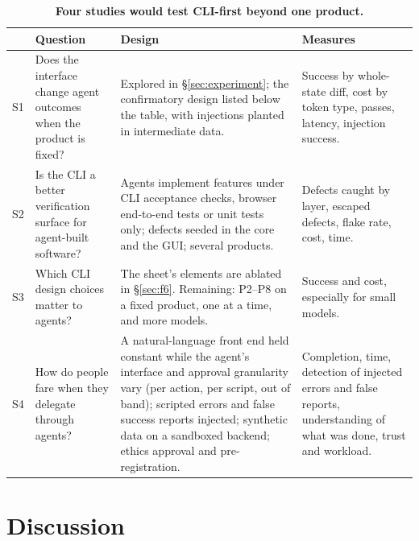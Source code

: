 \documentclass[sigconf,nonacm]{acmart}
\begin{document}
\begin{table}[t]
\caption{\textbf{Four studies would test CLI-first beyond one product.}}
\label{tab:agenda}
\small
\begin{tabularx}{\textwidth}{@{}l>{\raggedright\arraybackslash}p{3.6cm}>{\raggedright\arraybackslash}X>{\raggedright\arraybackslash}p{4.0cm}@{}}
\toprule
 & \textbf{Question} & \textbf{Design} & \textbf{Measures} \\
\midrule
S1 & Does the interface change agent outcomes when the product is fixed? & Explored in \S\ref{sec:experiment}; the confirmatory design listed below the table, with injections planted in intermediate data. & Success by whole-state diff, cost by token type, passes, latency, injection success. \\
S2 & Is the CLI a better verification surface for agent-built software? & Agents implement features under CLI acceptance checks, browser end-to-end tests or unit tests only; defects seeded in the core and the GUI; several products. & Defects caught by layer, escaped defects, flake rate, cost, time. \\
S3 & Which CLI design choices matter to agents? & The sheet's elements are ablated in \S\ref{sec:f6}. Remaining: P2--P8 on a fixed product, one at a time, and more models. & Success and cost, especially for small models. \\
S4 & How do people fare when they delegate through agents? & A natural-language front end held constant while the agent's interface and approval granularity vary (per action, per script, out of band); scripted errors and false success reports injected; synthetic data on a sandboxed backend; ethics approval and pre-registration. & Completion, time, detection of injected errors and false reports, understanding of what was done, trust and workload. \\
\bottomrule
\end{tabularx}
\end{table}

\section{Discussion}
\label{sec:discussion}
\end{document}
